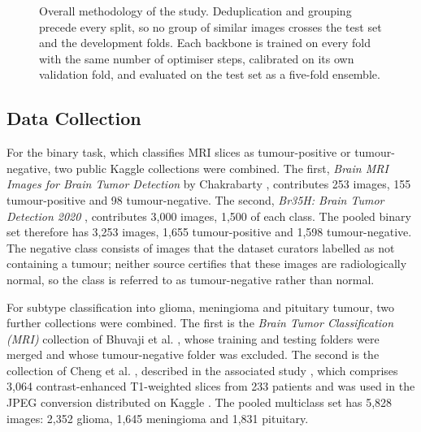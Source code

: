 \documentclass[final,3p,times,number]{elsarticle}
\begin{document}
\begin{figure}[htbp]
\caption{Overall methodology of the study. Deduplication and grouping precede every split, so no group of similar images crosses the test set and the development folds. Each backbone is trained on every fold with the same number of optimiser steps, calibrated on its own validation fold, and evaluated on the test set as a five-fold ensemble.}
\label{fig:methodology}
\end{figure}

\subsection{Data Collection}
\label{sec:data}

For the binary task, which classifies MRI slices as tumour-positive or tumour-negative, two public Kaggle collections were combined. The first, \textit{Brain MRI Images for Brain Tumor Detection} by Chakrabarty \cite{ds1}, contributes 253 images, 155 tumour-positive and 98 tumour-negative. The second, \textit{Br35H: Brain Tumor Detection 2020} \cite{ds2}, contributes 3,000 images, 1,500 of each class. The pooled binary set therefore has 3,253 images, 1,655 tumour-positive and 1,598 tumour-negative. The negative class consists of images that the dataset curators labelled as not containing a tumour; neither source certifies that these images are radiologically normal, so the class is referred to as tumour-negative rather than normal.

For subtype classification into glioma, meningioma and pituitary tumour, two further collections were combined. The first is the \textit{Brain Tumor Classification (MRI)} collection of Bhuvaji et al. \cite{ds3}, whose training and testing folders were merged and whose tumour-negative folder was excluded. The second is the collection of Cheng et al. \cite{ds4}, described in the associated study \cite{ref5}, which comprises 3,064 contrast-enhanced T1-weighted slices from 233 patients and was used in the JPEG conversion distributed on Kaggle \cite{ds5}. The pooled multiclass set has 5,828 images: 2,352 glioma, 1,645 meningioma and 1,831 pituitary.
\end{document}
